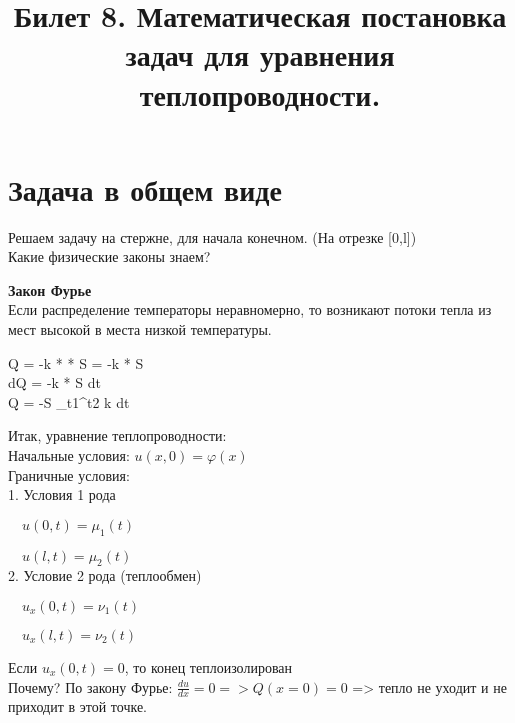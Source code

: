 \documentclass[11pt,a4paper, fqlen]{article}
\title{Билет 8. Математическая постановка задач для уравнения теплопроводности.}
\date{}
\begin{document}
	\maketitle
	
	\section{Задача в общем виде}
	Решаем задачу на стержне, для начала конечном. (На отрезке [0,l]) \\
	
	Какие физические законы знаем?
	
	 \textbf {Закон Фурье} \\
	 
	 
		Если распределение температоры неравномерно, то возникают потоки тепла из мест высокой в места низкой температуры.
		\begin{flalign}
		 Q = -k *  * S = -k *  S \\
		dQ = -k *  S dt \\
		Q = -S \int_{t1}^{t2} k  dt 
		\end{flalign}
		
		

	
	
	Итак, уравнение теплопроводности: \\
	Начальные условия: $u(x,0) = \varphi(x)$ \\
	Граничные условия: \\
	1. Условия 1 рода 
	
	 $\quad u(0,t) = \mu_1(t)$ 
	 
	 $\quad u(l,t) = \mu_2(t)$  \\ 
	2. Условие 2 рода (теплообмен)
	
	$\quad u_x(0,t) = \nu_1(t)$ 
	
	$\quad u_x(l,t) = \nu_2(t)$
	
	Если $u_x(0,t) = 0$, то конец теплоизолирован \\
	Почему? По закону Фурье: $\frac{du}{dx} = 0 => Q(x=0) = 0 $
	=> тепло не уходит и не приходит в этой точке.
	
\end{document}

